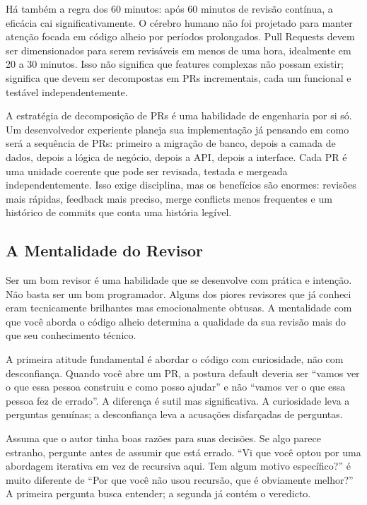 Há também a regra dos 60 minutos: após 60 minutos de revisão contínua, a eficácia
cai significativamente. O cérebro humano não foi projetado para manter atenção
focada em código alheio por períodos prolongados. Pull Requests devem ser
dimensionados para serem revisáveis em menos de uma hora, idealmente em 20 a 30
minutos. Isso não significa que features complexas não possam existir; significa que
devem ser decompostas em PRs incrementais, cada um funcional e testável
independentemente.

A estratégia de decomposição de PRs é uma habilidade de engenharia por si só. Um
desenvolvedor experiente planeja sua implementação já pensando em como será a
sequência de PRs: primeiro a migração de banco, depois a camada de dados, depois a
lógica de negócio, depois a API, depois a interface. Cada PR é uma unidade coerente
que pode ser revisada, testada e mergeada independentemente. Isso exige disciplina,
mas os benefícios são enormes: revisões mais rápidas, feedback mais preciso, merge
conflicts menos frequentes e um histórico de commits que conta uma história legível.

\subsection{A Mentalidade do Revisor}

Ser um bom revisor é uma habilidade que se desenvolve com prática e intenção. Não
basta ser um bom programador. Alguns dos piores revisores que já conheci eram
tecnicamente brilhantes mas emocionalmente obtusas. A mentalidade com que você aborda
o código alheio determina a qualidade da sua revisão mais do que seu conhecimento
técnico.

A primeira atitude fundamental é abordar o código com curiosidade, não com
desconfiança. Quando você abre um PR, a postura default deveria ser ``vamos ver o que
essa pessoa construiu e como posso ajudar'' e não ``vamos ver o que essa pessoa fez
de errado''. A diferença é sutil mas significativa. A curiosidade leva a perguntas
genuínas; a desconfiança leva a acusações disfarçadas de perguntas.

Assuma que o autor tinha boas razões para suas decisões. Se algo parece estranho,
pergunte antes de assumir que está errado. ``Vi que você optou por uma abordagem
iterativa em vez de recursiva aqui. Tem algum motivo específico?'' é muito diferente
de ``Por que você não usou recursão, que é obviamente melhor?'' A primeira pergunta
busca entender; a segunda já contém o veredicto.

